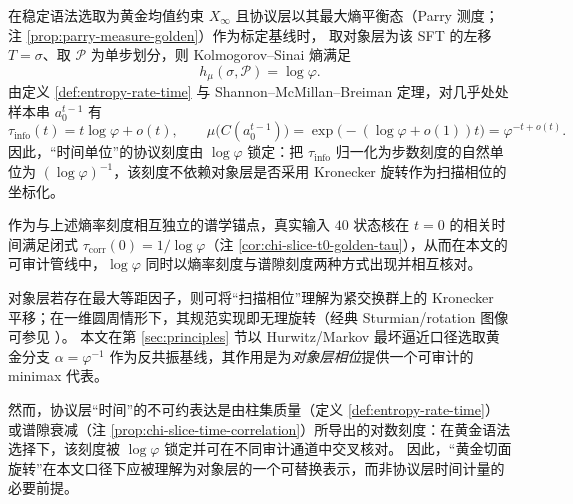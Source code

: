 \begin{proposition}\label{prop:time-unit-logphi-protocol}
在稳定语法选取为黄金均值约束 \(X_\infty\) 且协议层以其最大熵平衡态（Parry 测度；注 \ref{prop:parry-measure-golden}）作为标定基线时，
取对象层为该 SFT 的左移 \(T=\sigma\)、取 \(\mathcal{P}\) 为单步划分，则 Kolmogorov--Sinai 熵满足
\[
h_\mu(\sigma,\mathcal{P})=\log\varphi.
\]
由定义 \ref{def:entropy-rate-time} 与 Shannon--McMillan--Breiman 定理，对几乎处处样本串 \(a_0^{t-1}\) 有
\[
\tau_{\mathrm{info}}(t)=t\log\varphi+o(t),
\qquad
\mu\bigl(C(a_0^{t-1})\bigr)=\exp\!\bigl(-(\log\varphi+o(1))t\bigr)=\varphi^{-t+o(t)}.
\]
因此，“时间单位”的协议刻度由 \(\log\varphi\) 锁定：把 \(\tau_{\mathrm{info}}\) 归一化为步数刻度的自然单位为 \((\log\varphi)^{-1}\)，该刻度不依赖对象层是否采用 Kronecker 旋转作为扫描相位的坐标化。\par
作为与上述熵率刻度相互独立的谱学锚点，真实输入 \(40\) 状态核在 \(t=0\) 的相关时间满足闭式
\(\tau_{\mathrm{corr}}(0)=1/\log\varphi\)（注 \ref{cor:chi-slice-t0-golden-tau}），从而在本文的可审计管线中，\(\log\varphi\) 同时以熵率刻度与谱隙刻度两种方式出现并相互核对。
\end{proposition}

\begin{remark}\label{rem:isometric-factor-vs-time-metric}
对象层若存在最大等距因子，则可将“扫描相位”理解为紧交换群上的 Kronecker 平移；在一维圆周情形下，其规范实现即无理旋转（经典 Sturmian/rotation 图像可参见 \cite{MorseHedlund1940}）。
本文在第 \ref{sec:principles} 节以 Hurwitz/Markov 最坏逼近口径选取黄金分支 \(\alpha=\varphi^{-1}\) 作为反共振基线，其作用是为\emph{对象层相位}提供一个可审计的 minimax 代表。\par
然而，协议层“时间”的不可约表达是由柱集质量（定义 \ref{def:entropy-rate-time}）或谱隙衰减（注 \ref{prop:chi-slice-time-correlation}）所导出的对数刻度：在黄金语法选择下，该刻度被 \(\log\varphi\) 锁定并可在不同审计通道中交叉核对。
因此，“黄金切面旋转”在本文口径下应被理解为对象层的一个可替换表示，而非协议层时间计量的必要前提。
\end{remark}








